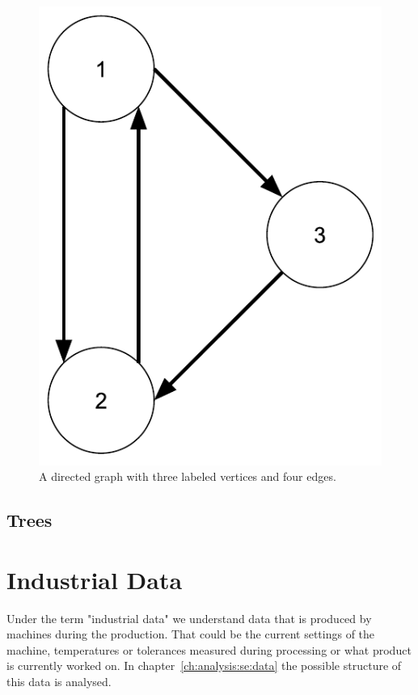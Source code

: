\begin{figure}[h]
  \centering
  \includegraphics[width=\textwidth/4]{images/simpleGraph}
  \caption{A directed graph with three labeled vertices and four edges.}
  \label{fig:simpleGraph}
\end{figure}

\subsection{Trees}

\section{Industrial Data}
\label{ch:background:se:industrialData}
Under the term "industrial data" we understand data that is produced by machines during the production.
That could be the current settings of the machine,
temperatures or tolerances measured during processing or what product is currently worked on.
In chapter~\ref{ch:analysis:se:data} the possible structure of this data is analysed.

